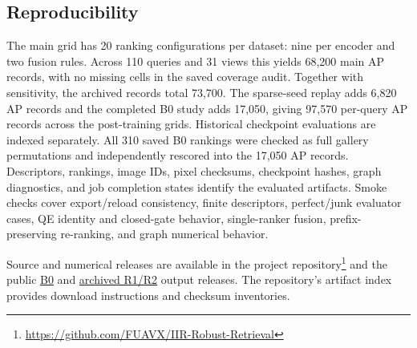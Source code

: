 \subsection{Reproducibility}
The main grid has 20 ranking configurations per dataset: nine per encoder and two fusion rules. Across 110 queries and 31 views this yields 68,200 main AP records, with no missing cells in the saved coverage audit. Together with sensitivity, the archived records total 73,700. The sparse-seed replay adds 6,820 AP records and the completed B0 study adds 17,050, giving 97,570 per-query AP records across the post-training grids. Historical checkpoint evaluations are indexed separately. All 310 saved B0 rankings were checked as full gallery permutations and independently rescored into the 17,050 AP records. Descriptors, rankings, image IDs, pixel checksums, checkpoint hashes, graph diagnostics, and job completion states identify the evaluated artifacts. Smoke checks cover export/reload consistency, finite descriptors, perfect/junk evaluator cases, QE identity and closed-gate behavior, single-ranker fusion, prefix-preserving re-ranking, and graph numerical behavior.

Source and numerical releases are available in the project repository\footnote{\url{https://github.com/FUAVX/IIR-Robust-Retrieval}} and the public \href{https://www.kaggle.com/datasets/ndhoang2310/iir-b0-complete-epoch12-results-v2}{B0} and \href{https://www.kaggle.com/datasets/ndhoang2310/iir-post100-raw-numerical-outputs-v1}{archived R1/R2} output releases. The repository's artifact index provides download instructions and checksum inventories.

